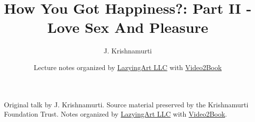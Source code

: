 \documentclass[11pt,oneside]{book}
\begin{document}
\frontmatter
\title{How You Got Happiness?: Part II - Love Sex And Pleasure}
\author{J. Krishnamurti}
\date{Lecture notes organized by \href{https://lazying.art}{LazyingArt LLC} with \href{https://github.com/lachlanchen/Video2Book}{Video2Book}}
\maketitle
\begin{center}
\small Original talk by J. Krishnamurti. Source material preserved by the Krishnamurti Foundation Trust. Notes organized by \href{https://lazying.art}{LazyingArt LLC} with \href{https://github.com/lachlanchen/Video2Book}{Video2Book}.
\end{center}
\clearpage
\mainmatter

\end{document}
